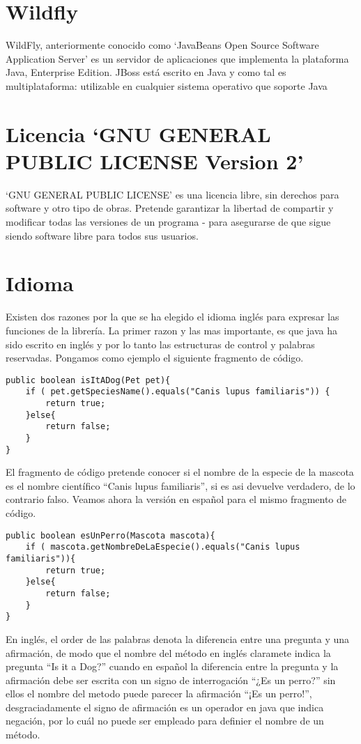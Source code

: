 	\section{Wildfly}
		WildFly, anteriormente conocido como `JavaBeans Open Source Software Application Server' es un servidor de aplicaciones que implementa la plataforma Java, Enterprise Edition. JBoss está escrito en Java y como tal es multiplataforma: utilizable en cualquier sistema operativo que soporte Java

	\section{Licencia `GNU GENERAL PUBLIC LICENSE Version 2'}

		`GNU GENERAL PUBLIC LICENSE' es una licencia libre, sin derechos para software y otro tipo de obras. Pretende garantizar la libertad de compartir y modificar todas las versiones de un programa - para asegurarse de que sigue siendo software libre para todos sus usuarios.
		
	\section{Idioma}

		Existen dos razones por la que se ha elegido el idioma inglés para expresar las funciones de la librería. La primer razon y las mas importante, es que java ha sido escrito en inglés y por lo tanto las estructuras de control y palabras reservadas. Pongamos como ejemplo el siguiente fragmento de código.

\begin{lstlisting}
public boolean isItADog(Pet pet){
	if ( pet.getSpeciesName().equals("Canis lupus familiaris")) {
		return true;
	}else{
		return false;
	}
}
\end{lstlisting}

	El fragmento de código pretende conocer si el nombre de la especie de la mascota es el nombre científico ``Canis lupus familiaris'', si es asi devuelve verdadero, de lo contrario falso. Veamos ahora la versión en español para el mismo fragmento de código.

\begin{lstlisting}
public boolean esUnPerro(Mascota mascota){
	if ( mascota.getNombreDeLaEspecie().equals("Canis lupus familiaris")){
		return true;
	}else{
		return false;
	}
}
\end{lstlisting}

	En inglés, el order de las palabras denota la diferencia entre una pregunta y una afirmación, de modo que el nombre del método en inglés claramete indica la pregunta ``Is it a Dog?'' cuando en español la diferencia entre la pregunta y la afirmación debe ser escrita con un signo de interrogación ``¿Es un perro?'' sin ellos el nombre del metodo puede parecer la afirmación ``¡Es un perro!'', desgraciadamente el signo de afirmación es un operador en java que indica negación, por lo cuál no puede ser empleado para definier el nombre de un método.

